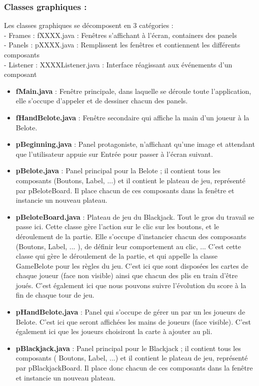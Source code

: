 \documentclass[a4paper]{report}
\begin{document}
\subsubsection{Classes graphiques :}
Les classes graphiques se décomposent en 3 catégories :\\
- Frames : fXXXX.java : Fenêtres s'affichant à l'écran, containers des panels\\
- Panels : pXXXX.java : Remplissent les fenêtres et contiennent les différents composants\\
- Listener : XXXXListener.java : Interface réagissant aux événements d'un composant\\
\begin{itemize}
\item \textbf{fMain.java} : Fenêtre principale, dans laquelle se déroule toute l'application, elle s'occupe d'appeler et de dessiner chacun des panels.
\item \textbf{fHandBelote.java} : Fenêtre secondaire qui affiche la main d'un joueur à la Belote.
\item \textbf{pBeginning.java} : Panel protagoniste, n'affichant qu'une image et attendant que l'utilisateur appuie sur Entrée pour passer à l'écran suivant.
\item \textbf{pBelote.java} : Panel principal pour la Belote ; il contient tous les composants (Boutons, Label, ...) et il contient le plateau de jeu, représenté par pBeloteBoard. Il place chacun de ces composants dans la fenêtre et instancie un nouveau plateau.
\item \textbf{pBeloteBoard.java} : Plateau de jeu du Blackjack. Tout le gros du travail se passe ici. Cette classe gère l'action sur le clic sur les boutons, et le déroulement de la partie. Elle s'occupe d'instancier chacun des composants (Boutons, Label, ... ), de définir leur comportement au clic, ... C'est cette classe qui gère le déroulement de la partie, et qui appelle la classe GameBelote pour les règles du jeu. C'est ici que sont disposées les cartes de chaque joueur (face non visible) ainsi que chacun des plis en train d'être joués. C'est également ici que nous pouvons suivre l'évolution du score à la fin de chaque tour de jeu.
\item \textbf{pHandBelote.java} : Panel qui s'occupe de gérer un par un les joueurs de Belote. C'est ici que seront affichées les mains de joueurs (face visible). C'est également ici que les joueurs choisiront la carte à ajouter au pli.
\item \textbf{pBlackjack.java} : Panel principal pour le Blackjack ; il contient tous les composants ( Boutons, Label, ...) et il contient le plateau de jeu, représenté par pBlackjackBoard. Il place donc chacun de ces composants dans la fenêtre et instancie un nouveau plateau.

\end{itemize}
\end{document}
